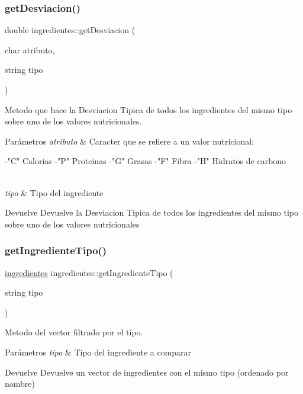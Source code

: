 \subsubsection{\texorpdfstring{get\+Desviacion()}{getDesviacion()}}
{\footnotesize\ttfamily double ingredientes\+::get\+Desviacion (\begin{DoxyParamCaption}\item[{char}]{atributo,  }\item[{string}]{tipo }\end{DoxyParamCaption})}



Metodo que hace la Desviacion Tipica de todos los ingredientes del mismo tipo sobre uno de los valores nutricionales. 


\begin{DoxyParams}{Parámetros}
{\em atributo} & Caracter que se refiere a un valor nutricional\+: \begin{DoxyVerb}    -"C" Calorias
    -"P" Proteinas
    -"G" Grasas
    -"F" Fibra
    -"H" Hidratos de carbono
\end{DoxyVerb}
\\
\hline
{\em tipo} & Tipo del ingrediente \\
\hline
\end{DoxyParams}
\begin{DoxyReturn}{Devuelve}
Devuelve la Desviacion Tipica de todos los ingredientes del mismo tipo sobre uno de los valores nutricionales 
\end{DoxyReturn}
\mbox{\label{classingredientes_a160ecb07facb16cbe7369ea797c67549}} 
\subsubsection{\texorpdfstring{get\+Ingrediente\+Tipo()}{getIngredienteTipo()}}
{\footnotesize\ttfamily \hyperlink{classingredientes}{ingredientes} ingredientes\+::get\+Ingrediente\+Tipo (\begin{DoxyParamCaption}\item[{string}]{tipo }\end{DoxyParamCaption})}



Metodo del vector filtrado por el tipo. 


\begin{DoxyParams}{Parámetros}
{\em tipo} & Tipo del ingrediente a comparar \\
\hline
\end{DoxyParams}
\begin{DoxyReturn}{Devuelve}
Devuelve un vector de ingredientes con el mismo tipo (ordenado por nombre) 
\end{DoxyReturn}
\mbox{\label{classingredientes_a6e4cfe264fddd851ccf2f2061d6b66ce}} 
